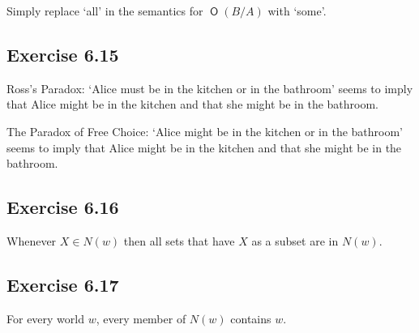 \documentclass{scrartcl}
\DeclareMathOperator{\Ob}{\mathsf{O}}
\begin{document}
%
%
  Simply replace `all' in the semantics for $\Ob(B/A)$ with `some'.

  \subsection*{Exercise 6.15}

%
%
  Ross's Paradox: `Alice must be in the kitchen or in the bathroom'
  seems to imply that Alice might be in the kitchen and that she might
  be in the bathroom.

  The Paradox of Free Choice: `Alice might be in the kitchen or in the
  bathroom' seems to imply that Alice might be in the kitchen and that
  she might be in the bathroom.

  \subsection*{Exercise 6.16}

%
%
  Whenever $X \in N(w)$ then all sets that have $X$ as a subset are in
  $N(w)$.

  \subsection*{Exercise 6.17}

%
%
  For every world $w$, every member of $N(w)$ contains $w$.
\end{document}

